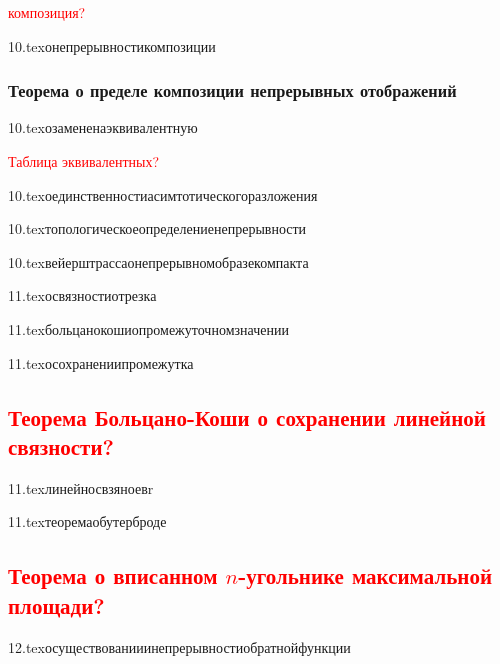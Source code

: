 
\textcolor{red}{композиция?}

{10.tex}{онепрерывностикомпозиции}

\subsubsection{Теорема о пределе композиции непрерывных отображений}


{10.tex}{озамененаэквивалентную}

\textcolor{red}{Таблица эквивалентных?}

{10.tex}{оединственностиасимтотическогоразложения}

{10.tex}{топологическоеопределениенепрерывности}

{10.tex}{вейерштрассаонепрерывномобразекомпакта}


{11.tex}{освязностиотрезка}

{11.tex}{больцанокошиопромежуточномзначении}

{11.tex}{осохранениипромежутка}

\subsection{\textcolor{red}{Теорема Больцано-Коши о сохранении линейной связности?}}

{11.tex}{линейносвзяноевr}

{11.tex}{теоремаобутерброде}

\subsection{\textcolor{red}{Теорема о вписанном $n$-угольнике максимальной площади?}}

{12.tex}{осуществованииинепрерывностиобратнойфункции}


